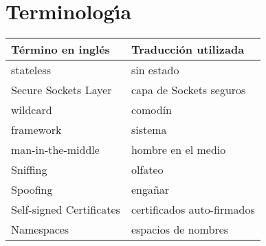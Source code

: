 \section{Terminolog\'{\i}a}

\begin{longtable}{|l|l|} \hline
\textbf{T\'ermino en ingl\'es} & \textbf{Traducci\'on utilizada}
\\ \hline \hline stateless & sin estado
\\ \hline Secure Sockets Layer & capa de Sockets seguros
\\ \hline wildcard & comodín
\\ \hline framework & sistema
\\ \hline man-in-the-middle & hombre en el medio
\\ \hline Sniffing & olfateo
\\ \hline Spoofing & engañar
\\ \hline Self-signed Certificates & certificados auto-firmados
\\ \hline Namespaces & espacios de nombres  \\ \hline
\end{longtable}


